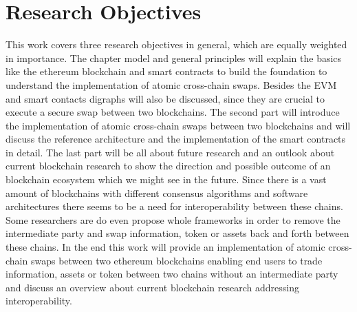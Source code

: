 %
%
\section{Research Objectives}
\label{sec:intro:goal}
This work covers three research objectives in general, which are equally weighted in importance. The chapter model and general principles will explain the basics like the ethereum blockchain and smart contracts to build the foundation to understand the implementation of atomic cross-chain swaps. Besides the \ac{EVM} and smart contacts digraphs will also be discussed, since they are crucial to execute a secure swap between two blockchains. The second part will introduce the implementation of atomic cross-chain swaps between two blockchains and will discuss the reference architecture and the implementation of the smart contracts in detail. The last part will be all about future research and an outlook about current blockchain research to show the direction and possible outcome of an blockchain ecosystem which we might see in the future. Since there is a vast amount of blockchains with different consensus algorithms and software architectures there seems to be a need for interoperability between these chains. Some researchers are do even propose whole frameworks in order to remove the intermediate party and swap information, token or assets back and forth between these chains. In the end this work will provide an implementation of atomic cross-chain swaps between two ethereum blockchains enabling end users to trade information, assets or token between two chains without an intermediate party and discuss an overview about current blockchain research addressing interoperability.



